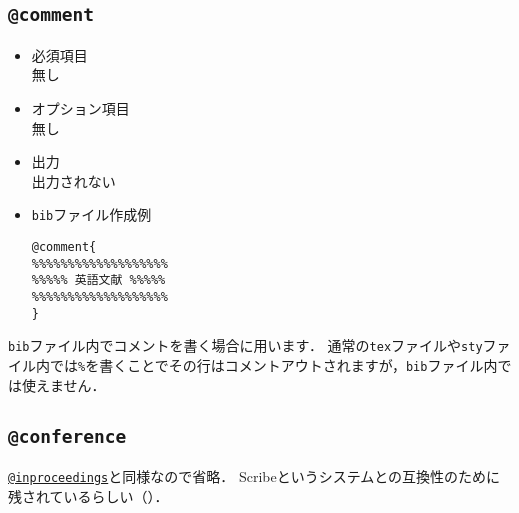 \documentclass[a4paper,fleqn,uplatex,dvipdfmx]{jsarticle}
\makeatletter
\newcommand{\ttcomment}{\texttt{@comment}}
\newcommand{\ttconference}{\texttt{@conference}}
\newcommand{\ttinproceedings}{\texttt{@inproceedings}}
\makeatother
\begin{document}
\subsection{\ttcomment}
\label{ssec:comment}
\begin{screen}
    \begin{itemize}
        \item 必須項目 \\
        無し
        \item オプション項目 \\
        無し
        \item 出力 \\
        出力されない
        \item \verb|bib|ファイル作成例 \vspace{-3mm}
\begin{verbatim}
@comment{
%%%%%%%%%%%%%%%%%%%
%%%%% 英語文献 %%%%%
%%%%%%%%%%%%%%%%%%%
}
\end{verbatim}
    \end{itemize}
\end{screen}

\verb|bib|ファイル内でコメントを書く場合に用います．
通常の\verb|tex|ファイルや\verb|sty|ファイル内では\verb|%|を書くことでその行はコメントアウトされますが，\verb|bib|ファイル内では使えません．


\subsection{\ttconference}
\label{ssec:conference}
\hyperref[ssec:inproceedings]{\ttinproceedings}と同様なので省略．
Scribeというシステムとの互換性のために残されているらしい（\citealp{奥村:技評2020}）．
\end{document}
